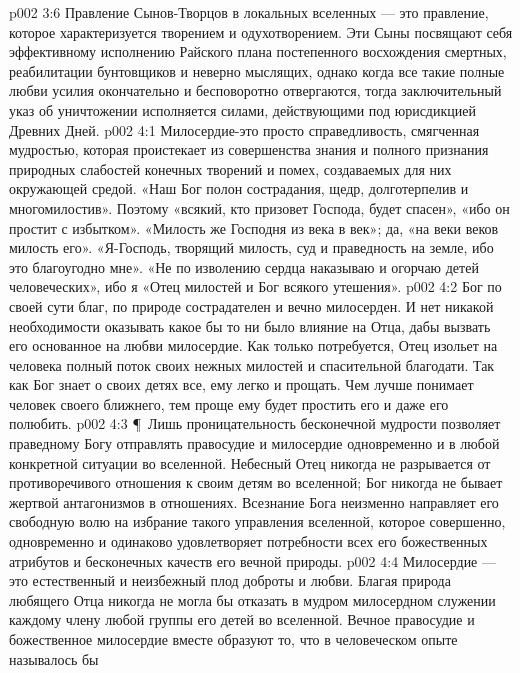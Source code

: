 \vs p002 3:6 Правление Сынов\hyp{}Творцов в локальных вселенных --- это правление, которое характеризуется творением и одухотворением. Эти Сыны посвящают себя эффективному исполнению Райского плана постепенного восхождения смертных, реабилитации бунтовщиков и неверно мыслящих, однако когда все такие полные любви усилия окончательно и бесповоротно отвергаются, тогда заключительный указ об уничтожении исполняется силами, действующими под юрисдикцией Древних Дней.
\vs p002 4:1 Милосердие\hyp{}это просто справедливость, смягченная мудростью, которая проистекает из совершенства знания и полного признания природных слабостей конечных творений и помех, создаваемых для них окружающей средой. «Наш Бог полон сострадания, щедр, долготерпелив и многомилостив». Поэтому «всякий, кто призовет Господа, будет спасен», «ибо он простит с избытком». «Милость же Господня из века в век»; да, «на веки веков милость его». «Я\hyp{}Господь, творящий милость, суд и праведность на земле, ибо это благоугодно мне». «Не по изволению сердца наказываю и огорчаю детей человеческих», ибо я «Отец милостей и Бог всякого утешения».
\vs p002 4:2 Бог по своей сути благ, по природе сострадателен и вечно милосерден. И нет никакой необходимости оказывать какое бы то ни было влияние на Отца, дабы вызвать его основанное на любви милосердие. Как только потребуется, Отец изольет на человека полный поток своих нежных милостей и спасительной благодати. Так как Бог знает о своих детях все, ему легко и прощать. Чем лучше понимает человек своего ближнего, тем проще ему будет простить его и даже его полюбить.
\vs p002 4:3 \P\ Лишь проницательность бесконечной мудрости позволяет праведному Богу отправлять правосудие и милосердие одновременно и в любой конкретной ситуации во вселенной. Небесный Отец никогда не разрывается от противоречивого отношения к своим детям во вселенной; Бог никогда не бывает жертвой антагонизмов в отношениях. Всезнание Бога неизменно направляет его свободную волю на избрание такого управления вселенной, которое совершенно, одновременно и одинаково удовлетворяет потребности всех его божественных атрибутов и бесконечных качеств его вечной природы.
\vs p002 4:4 Милосердие --- это естественный и неизбежный плод доброты и любви. Благая природа любящего Отца никогда не могла бы отказать в мудром милосердном служении каждому члену любой группы его детей во вселенной. Вечное правосудие и божественное милосердие вместе образуют то, что в человеческом опыте называлось бы 
